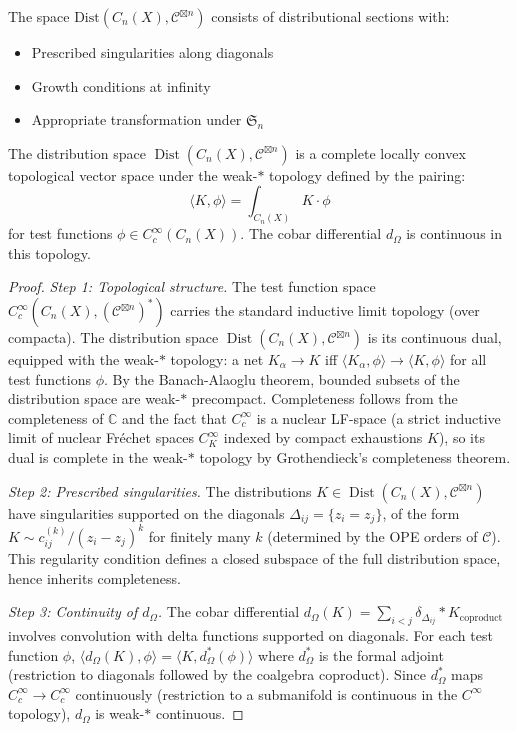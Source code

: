 \begin{definition}
The space $\text{Dist}(C_n(X), \mathcal{C}^{\boxtimes n})$ consists of distributional sections with:
\begin{itemize}
\item Prescribed singularities along diagonals
\item Growth conditions at infinity
\item Appropriate transformation under $\mathfrak{S}_n$
\end{itemize}
\end{definition}

\begin{theorem}\label{thm:weak-topology}
The distribution space $\operatorname{Dist}(C_n(X), \mathcal{C}^{\boxtimes n})$ is a complete locally convex topological vector space under the weak-$*$ topology defined by the pairing:
\[\langle K, \phi \rangle = \int_{C_n(X)} K \cdot \phi\]
for test functions $\phi \in C_c^\infty(C_n(X))$.  The cobar differential $d_\Omega$ is continuous in this topology.
\end{theorem}

\begin{proof}
\emph{Step 1: Topological structure.}
The test function space $C_c^\infty(C_n(X), (\mathcal{C}^{\boxtimes n})^*)$ carries the standard inductive limit topology (over compacta).  The distribution space $\operatorname{Dist}(C_n(X), \mathcal{C}^{\boxtimes n})$ is its continuous dual, equipped with the weak-$*$ topology: a net $K_\alpha \to K$ iff $\langle K_\alpha, \phi \rangle \to \langle K, \phi \rangle$ for all test functions $\phi$.  By the Banach-Alaoglu theorem, bounded subsets of the distribution space are weak-$*$ precompact.  Completeness follows from the completeness of $\mathbb{C}$ and the fact that $C_c^\infty$ is a nuclear LF-space (a strict inductive limit of nuclear Fréchet spaces $C^\infty_K$ indexed by compact exhaustions $K$), so its dual is complete in the weak-$*$ topology by Grothendieck's completeness theorem.

\emph{Step 2: Prescribed singularities.}
The distributions $K \in \operatorname{Dist}(C_n(X), \mathcal{C}^{\boxtimes n})$ have singularities supported on the diagonals $\Delta_{ij} = \{z_i = z_j\}$, of the form $K \sim c_{ij}^{(k)}/(z_i - z_j)^k$ for finitely many $k$ (determined by the OPE orders of $\mathcal{C}$).  This regularity condition defines a closed subspace of the full distribution space, hence inherits completeness.

\emph{Step 3: Continuity of $d_\Omega$.}
The cobar differential $d_\Omega(K) = \sum_{i < j} \delta_{\Delta_{ij}} * K_{\text{coproduct}}$ involves convolution with delta functions supported on diagonals.  For each test function $\phi$, $\langle d_\Omega(K), \phi \rangle = \langle K, d_\Omega^*(\phi) \rangle$ where $d_\Omega^*$ is the formal adjoint (restriction to diagonals followed by the coalgebra coproduct).  Since $d_\Omega^*$ maps $C_c^\infty \to C_c^\infty$ continuously (restriction to a submanifold is continuous in the $C^\infty$ topology), $d_\Omega$ is weak-$*$ continuous.
\end{proof}

